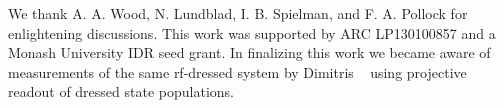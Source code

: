 \documentclass[aps,prl,reprint,superscriptaddress,floatfix]{revtex4-1}
\begin{document}
We thank A. A. Wood, N. Lundblad, I. B. Spielman, and F. A. Pollock for enlightening discussions.
This work was supported by ARC LP130100857 and a Monash University IDR seed grant. 
In finalizing this work we became aware of measurements of the same rf-dressed system by Dimitris \etal~\cite{dimitris_synthetic_2017} using projective readout of dressed state populations. 


\end{document}
